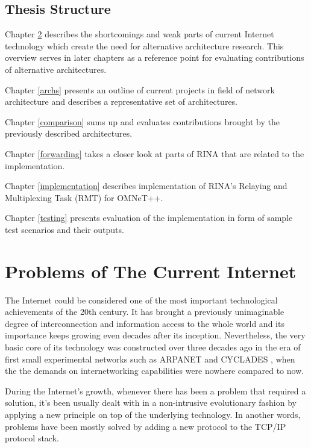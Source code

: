     \section{Thesis Structure}

        Chapter \ref{problems} describes the shortcomings and weak parts of current Internet technology which create the need for alternative architecture research. This overview serves in later chapters as a reference point for evaluating contributions of alternative architectures.

        Chapter \ref{archs} presents an outline of current projects in field of network architecture and describes a representative set of architectures.

        Chapter \ref{comparison} sums up and evaluates contributions brought by the previously described architectures.

        Chapter \ref{forwarding} takes a closer look at parts of RINA that are related to the implementation.

        Chapter \ref{implementation} describes implementation of RINA's Relaying and Multiplexing Task (RMT) for OMNeT++.

        Chapter \ref{testing} presents evaluation of the implementation in form of sample test scenarios and their outputs.


\chapter{Problems of The Current Internet}\label{problems}

    The Internet could be considered one of the most important technological achievements of the 20th century. It has brought a previously unimaginable degree of interconnection and information access to the whole world and its importance keeps growing even decades after its inception. Nevertheless, the very basic core of its technology was constructed over three decades ago in the era of first small experimental networks such as ARPANET and CYCLADES \cite{Kurose}, when the the demands on internetworking capabilities were nowhere compared to now.

    During the Internet's growth, whenever there has been a problem that required a solution, it's been usually dealt with in a non-intrusive evolutionary fashion by applying a new principle on top of the underlying technology. In another words, problems have been mostly solved by adding a new protocol to the TCP/IP protocol stack.

